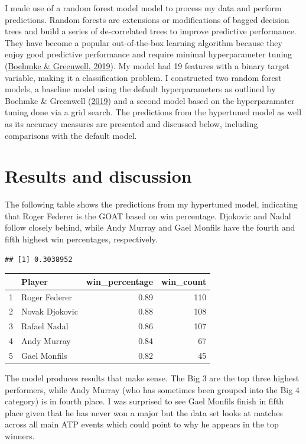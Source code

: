 \documentclass[11pt,preprint, authoryear]{elsarticle}
\let\origtable\table
\let\endorigtable\endtable
\renewenvironment{table}[1][2] {
    \expandafter\origtable\expandafter[H]
} {
    \endorigtable
}
\numberwithin{equation}{section}
\numberwithin{figure}{section}
\numberwithin{table}{section}
\begin{document}
I made use of a random forest model model to process my data and perform
predictions. Random forests are extensions or modifications of bagged
decision trees and build a series of de-correlated trees to improve
predictive performance. They have become a popular out-of-the-box
learning algorithm because they enjoy good predictive performance and
require minimal hyperparameter tuning
(\protect\hyperlink{ref-boehmke2019hands}{Boehmke \& Greenwell, 2019}).
My model had 19 features with a binary target variable, making it a
classification problem. I constructed two random forest models, a
baseline model using the default hyperparameters as outlined by Boehmke
\& Greenwell (\protect\hyperlink{ref-boehmke2019hands}{2019}) and a
second model based on the hyperparamater tuning done via a grid search.
The predictions from the hypertuned model as well as its accuracy
measures are presented and discussed below, including comparisons with
the default model.

\hypertarget{results-and-discussion}{%
\section{Results and discussion}\label{results-and-discussion}}

The following table shows the predictions from my hypertuned model,
indicating that Roger Federer is the GOAT based on win percentage.
Djokovic and Nadal follow closely behind, while Andy Murray and Gael
Monfils have the fourth and fifth highest win percentages, respectively.

\begin{verbatim}
## [1] 0.3038952
\end{verbatim}

\begin{table}[ht]
\centering
\begin{tabular}{rlrr}
  \hline
 & Player & win\_percentage & win\_count \\ 
  \hline
1 & Roger Federer & 0.89 & 110 \\ 
  2 & Novak Djokovic & 0.88 & 108 \\ 
  3 & Rafael Nadal & 0.86 & 107 \\ 
  4 & Andy Murray & 0.84 &  67 \\ 
  5 & Gael Monfils & 0.82 &  45 \\ 
   \hline
\end{tabular}
\caption{The Best of Tennis} 
\end{table}

The model produces results that make sense. The Big 3 are the top three
highest performers, while Andy Murray (who has sometimes been grouped
into the Big 4 category) is in fourth place. I was surprised to see Gael
Monfils finish in fifth place given that he has never won a major but
the data set looks at matches across all main ATP events which could
point to why he appears in the top winners.
\end{document}
